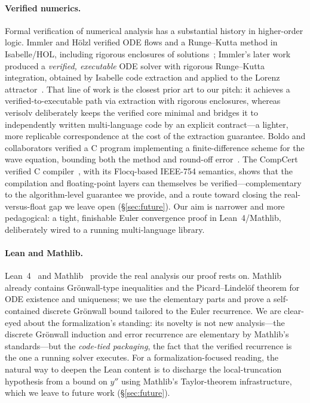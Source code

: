 \documentclass[sigplan,nonacm,screen]{acmart}
\begin{document}
\paragraph{Verified numerics.}
Formal verification of numerical analysis has a substantial history in
higher-order logic. Immler and Hölzl verified ODE flows and a Runge--Kutta
method in Isabelle/HOL, including rigorous enclosures of
solutions~\cite{immler2012}; Immler's later work produced a \emph{verified,
executable} ODE solver with rigorous Runge--Kutta integration, obtained by
Isabelle code extraction and applied to the Lorenz attractor~\cite{immler2018}.
That line of work is the closest prior art to our pitch: it achieves a
verified-to-executable path via extraction with rigorous enclosures, whereas
verisolv deliberately keeps the verified core minimal and bridges it to
independently written multi-language code by an explicit contract---a lighter,
more replicable correspondence at the cost of the extraction guarantee.
Boldo and collaborators verified a C program implementing a finite-difference
scheme for the wave equation, bounding both the method and round-off
error~\cite{boldo2013wave}. The CompCert verified C compiler~\cite{leroy2009},
with its Flocq-based IEEE-754 semantics, shows that the compilation and
floating-point layers can themselves be verified---complementary to the
algorithm-level guarantee we provide, and a route toward closing the
real-versus-float gap we leave open (\S\ref{sec:future}). Our aim is
narrower and more pedagogical: a tight, finishable Euler convergence proof in
Lean~4/Mathlib, deliberately wired to a running multi-language library.

\paragraph{Lean and Mathlib.}
Lean~4~\cite{demoura2021lean4} and Mathlib~\cite{mathlib2020} provide the real
analysis our proof rests on. Mathlib already contains Grönwall-type inequalities
and the Picard--Lindelöf theorem for ODE existence and uniqueness; we use the
elementary parts and prove a self-contained discrete Grönwall bound tailored to
the Euler recurrence. We are clear-eyed about the formalization's standing: its
novelty is not new analysis---the discrete Grönwall induction and error
recurrence are elementary by Mathlib's standards---but the \emph{code-tied
packaging}, the fact that the verified recurrence is the one a running solver
executes. For a formalization-focused reading, the natural way to deepen the Lean
content is to discharge the local-truncation hypothesis from a bound on $y''$
using Mathlib's Taylor-theorem infrastructure, which we leave to future work
(\S\ref{sec:future}).
\end{document}
